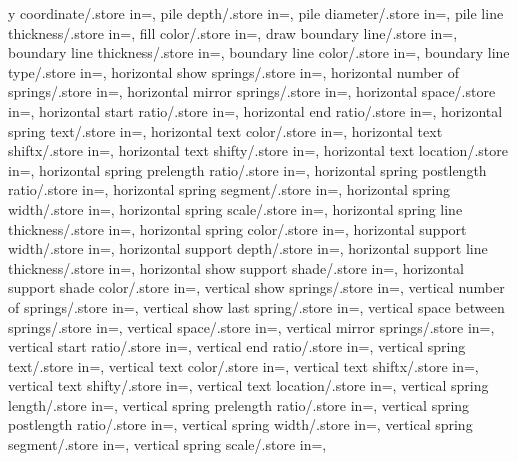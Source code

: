 {  y coordinate/.store in=\coordinatey,
  pile depth/.store in=\pdepth,
  pile diameter/.store in=\pdiameter,
  pile line thickness/.store in=\plinethick,  
  fill color/.store in=\fillcolor,
  draw boundary line/.store in=\drawboundryline,
  boundary line thickness/.store in=\blinethick,
  boundary line color/.store in=\blinecolor,
  boundary line type/.store in=\blinetype,
  horizontal show springs/.store in=\showhorizontalsprings,
  horizontal number of springs/.store in=\horspringnumber,
  horizontal mirror springs/.store in=\hormirrorspring,
  horizontal space/.store in=\horspringspace,
  horizontal start ratio/.store in=\horspringstartratio,
  horizontal end ratio/.store in=\horspringendratio,
  horizontal spring text/.store in=\horspringtext,
  horizontal text color/.store in=\hortextcolor,
  horizontal text shiftx/.store in=\hortextshiftx,
  horizontal text shifty/.store in=\hortextshifty,
  horizontal text location/.store in=\hortextloc,
  horizontal spring prelength ratio/.store in=\horprelenratio,
  horizontal spring postlength ratio/.store in=\horpostlenratio,
  horizontal spring segment/.store in=\horsegm,
  horizontal spring width/.store in=\horsprwid,
  horizontal spring scale/.store in=\horsprscale,
  horizontal spring line thickness/.store in=\horsprlinethk,
  horizontal spring color/.store in=\horsprcolor,
  horizontal support width/.store in=\horsuppwidth,
  horizontal support depth/.store in=\horsuppdepth,
  horizontal support line thickness/.store in=\horsupplinethk,
  horizontal show support shade/.store in=\horshowsuppshade,
  horizontal support shade color/.store in=\horsuppshadecol,
  vertical show springs/.store in=\showverticalsprings,  
  vertical number of springs/.store in=\verspringnumber,
  vertical show last spring/.store in=\vershowlastspring,
  vertical space between springs/.store in=\verspbtwspr,
  vertical space/.store in=\verspringspace,
  vertical mirror springs/.store in=\vermirrorspring,
  vertical start ratio/.store in=\verspringstartratio,
  vertical end ratio/.store in=\verspringendratio,
  vertical spring text/.store in=\verspringtext,
  vertical text color/.store in=\vertextcolor,
  vertical text shiftx/.store in=\vertextshiftx,
  vertical text shifty/.store in=\vertextshifty,
  vertical text location/.store in=\vertextloc,
  vertical spring length/.store in=\verspringlength,
  vertical spring prelength ratio/.store in=\verprelenratio,
  vertical spring postlength ratio/.store in=\verpostlenratio,
  vertical spring width/.store in=\versprwid,
  vertical spring segment/.store in=\versegm,
  vertical spring scale/.store in=\versprscale,
}
